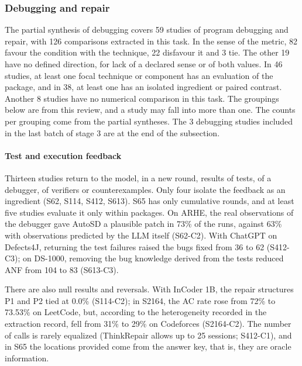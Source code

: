 \subsubsection{Debugging and repair}

The partial synthesis of debugging covers 59 studies of program debugging and repair, with 126 comparisons extracted in this task. In
the sense of the metric, 82 favour the condition with the technique, 22 disfavour it and 3 tie. The other 19 have no
defined direction, for lack of a declared sense or of both values. In 46 studies, at least one focal technique or
component has an evaluation of the package, and in 38, at least one has an isolated ingredient or paired contrast. Another 8 studies have no
numerical comparison in this task. The groupings below are from this review, and a study may fall into more than one.
The counts per grouping come from the partial syntheses. The 3 debugging studies included in the last batch of
stage 3 are at the end of the subsection.

\paragraph{Test and execution feedback}
Thirteen studies return to the model, in a new round, results of tests, of a debugger, of verifiers or counterexamples. Only four isolate the feedback as an ingredient (S62, S114, S412, S613). S65 has only cumulative rounds, and at least five studies evaluate it only within packages.
On ARHE, the real observations of the debugger gave AutoSD a plausible patch in 73\% of the runs, against 63\% with observations predicted by the LLM itself (S62-C2).
With ChatGPT on Defects4J, returning the test failures raised the bugs fixed from 36 to 62 (S412-C3); on DS-1000, removing the bug knowledge derived from the tests reduced ANF from 104 to 83 (S613-C3).

There are also null results and reversals.
With InCoder 1B, the repair structures P1 and P2 tied at 0.0\% (S114-C2); in S2164, the AC rate rose from 72\% to 73.53\% on LeetCode, but, according to the heterogeneity recorded in the extraction record, fell from 31\% to 29\% on Codeforces (S2164-C2).
The number of calls is rarely equalized (ThinkRepair allows up to 25 sessions; S412-C1), and in S65 the locations provided come from the answer key, that is, they are oracle information.


